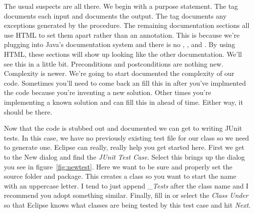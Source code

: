 \documentclass[]{tufte-handout}
\begin{document}
The usual suspects are all there. We begin with a purpose statement. The \@param tag documents each input and \@return documents the output.  The \@throws tag documents any exceptions generated by the procedure. The remaining documentation sections all use HTML to set them apart rather than an \@ annotation. This is because we're plugging into Java's documentation system and there is no \@pre, \@post, and \@complexity.  By using HTML, these sections will show up looking like the other documentation. We'll see this in a little bit. Preconditions and postconditions are nothing new. Complexity is newer. We're going to start documented the complexity of our code. Sometimes you'll need to come back an fill this in after you've implmented the code because you're inventing a new solution. Other times you're implementing a known solution and can fill this in ahead of time. Either way, it should be there.

Now that the code is stubbed out and documented we can get to writing JUnit tests. In this case, we have no previously existing test file for our class so we need to generate one. Eclipse can really, really help you get started here. First we get to the New dialog and find the \textit{JUnit Test Case}. Select this brings up the dialog you see in figure~\ref{fig:newtest}.  Here we want to be sure and 	properly set the source folder and package. This creates a class so you want to start the name with an uppercase letter. I tend to just append \textit{\_Tests} after the class name and I recommend you adopt something similar. Finally, fill in or select the \textit{Class Under} so that Eclipse knows what classes are being tested by this test case and hit \textit{Next}.
\end{document}
